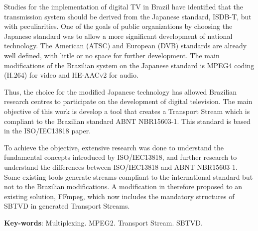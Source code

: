 \documentclass[
	12pt,				%
	openright,			%
	twoside,			%
	a4paper,			%
	brazil,
	french,				%
	english
	]{abntex2}
\begin{document}
\begin{resumo}[Abstract]

Studies for the implementation of digital TV in Brazil have identified that the transmission system should be derived from the Japanese standard, ISDB-T, but with peculiarities. One of the goals of public organizations by choosing the Japanese standard was to allow a more significant development of national technology. The American (ATSC) and European (DVB) standards are already well defined, with little or no space for further development. The main modifications of the Brazilian system on the Japanese standard is MPEG4 coding (H.264) for video and HE-AACv2 for audio.

Thus, the choice for the modified Japanese technology has allowed Brazilian research centres to participate on the development of digital television. The main objective of this work is develop a tool that creates a Transport Stream which is compliant to the Brazilian standard ABNT NBR15603-1. This standard is based in the ISO/IEC13818 paper.

To achieve the objective, extensive research was done to understand the fundamental concepts introduced by ISO/IEC13818, and further research to understand the differences between ISO/IEC13818 and ABNT NBR15603-1. Some existing tools generate streams compliant to the international standard but not to the Brazilian modifications. A modification in therefore proposed to an existing solution, FFmpeg, which now includes the mandatory structures of SBTVD in generated Transport Streams.

   \vspace{\onelineskip}
 
   \noindent 
   \textbf{Key-words}: Multiplexing. MPEG2. Transport Stream. SBTVD.
 
\end{resumo}

 
\end{document}
